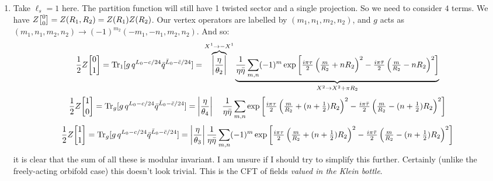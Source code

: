 \documentclass[11pt]{article}
\begin{document}
\begin{enumerate}
	\item Take $\ell_s = 1$ here. The partition function will still have 1 twisted sector and a single projection. So we need to consider $4$ terms. We have $Z\twist00 = Z(R_1, R_2) = Z(R_1) Z(R_2)$. Our vertex operators are labelled by $(m_1, n_1, m_2, n_2)$, and $g$ acts as $(m_1, n_1, m_2, n_2) \to (-1)^{m_2} (-m_1, -n_1, m_2, n_2)$. And so:
	\[
		\frac12 Z\twist01 = \mathrm{Tr}_1[g\, q^{L_0 - c/24} \bar q^{\bar L_0 - \bar c/24}] = \overbrace{\left|\frac{\eta}{\theta_2}\right|}^{X^1 \to -X^1}
		 \underbrace{\frac{1}{\eta \bar \eta}\sum_{m, n} (-1)^m \exp\left[\tfrac{i \pi \tau}{2} \left( \tfrac{m}{R_2} + n R_2 \right)^2 - \tfrac{i \pi \bar \tau}{2} \left( \tfrac{m}{R_2} - n R_2 \right)^2  \right] }_{X^2 \to X^2 + \pi R_2}
	\]
	\[
		\frac12 Z\twist10 = \mathrm{Tr}_g[g\, q^{L_0 - c/24} \bar q^{\bar L_0 - \bar c/24}] = \left|\frac{\eta}{\theta_4}\right| \quad \frac{1}{\eta \bar \eta}\sum_{m, n} \exp\left[\tfrac{i \pi \tau}{2} \left( \tfrac{m}{R_2} + (n + \tfrac12) R_2 \right)^2 - \tfrac{i \pi \bar \tau}{2} \left( \tfrac{m}{R_2} - (n + \tfrac12) R_2 \right)^2  \right]
	\]
	\[
		\frac12 Z\twist11 = \mathrm{Tr}_g[g\, q^{L_0 - c/24} \bar q^{\bar L_0 - \bar c/24}] = \left|\frac{\eta}{\theta_3}\right| \frac{1}{\eta \bar \eta}\sum_{m, n} (-1)^m \exp\left[\tfrac{i \pi \tau}{2} \left( \tfrac{m}{R_2} + (n + \tfrac12) R_2 \right)^2 - \tfrac{i \pi \bar \tau}{2} \left( \tfrac{m}{R_2} - (n + \tfrac12) R_2 \right)^2  \right]
	\]
	it is clear that the sum of all these is modular invariant. I am unsure if I should try to simplify this further. Certainly (unlike the freely-acting orbifold case) this doesn't look trivial. This is the CFT of fields \emph{valued in the Klein bottle}.
	

\end{enumerate}
\end{document}
